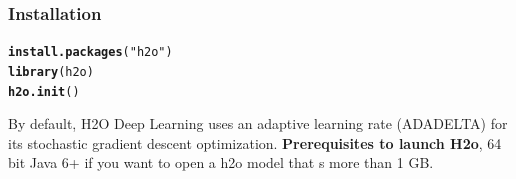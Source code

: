 \documentclass[letter]{article}\usepackage[]{graphicx}\usepackage[]{color}
\makeatletter
\newcommand{\hlstr}[1]{\textcolor[rgb]{0.192,0.494,0.8}{#1}}%
\newcommand{\hlstd}[1]{\textcolor[rgb]{0.345,0.345,0.345}{#1}}%
\newcommand{\hlkwd}[1]{\textcolor[rgb]{0.737,0.353,0.396}{\textbf{#1}}}%
\newenvironment{kframe}{%
 \def\at@end@of@kframe{}%
 \ifinner\ifhmode%
  \def\at@end@of@kframe{\end{minipage}}%
  \begin{minipage}{\columnwidth}%
 \fi\fi%
 \def\FrameCommand##1{\hskip\@totalleftmargin \hskip-\fboxsep
 \colorbox{shadecolor}{##1}\hskip-\fboxsep
     \hskip-\linewidth \hskip-\@totalleftmargin \hskip\columnwidth}%
 \MakeFramed {\advance\hsize-\width
   \@totalleftmargin\z@ \linewidth\hsize
   \@setminipage}}%
 {\par\unskip\endMakeFramed%
 \at@end@of@kframe}
\newenvironment{knitrout}{}{} %
\makeatother
\begin{document}
\subsubsection{Installation}
\begin{knitrout}
\color{fgcolor}\begin{kframe}
\begin{alltt}
\hlkwd{install.packages}\hlstd{(}\hlstr{"h2o"}\hlstd{)}
\hlkwd{library}\hlstd{(h2o)}
\hlkwd{h2o.init}\hlstd{()}
\end{alltt}
\end{kframe}
\end{knitrout}
By default, H2O Deep Learning uses an adaptive learning rate (ADADELTA) for its stochastic gradient descent optimization.
\textbf{Prerequisites to launch H2o}, 64 bit Java 6+ if you want to open a h2o model that s more than 1 GB. 
\end{document}
